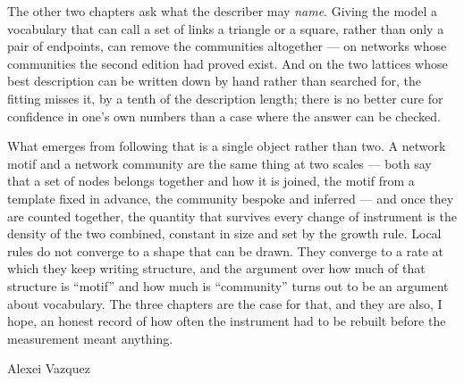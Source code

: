 \documentclass[10pt]{book}
\begin{document}
The other two chapters ask what the describer may \emph{name}. Giving the model a
vocabulary that can call a set of links a triangle or a square, rather than only
a pair of endpoints, can remove the communities altogether --- on networks whose
communities the second edition had proved exist. And on the two lattices whose
best description can be written down by hand rather than searched for, the
fitting misses it, by a tenth of the description length; there is no better cure
for confidence in one's own numbers than a case where the answer can be checked.

What emerges from following that is a single object rather than two. A network
motif and a network community are the same thing at two scales --- both say that
a set of nodes belongs together and how it is joined, the motif from a template
fixed in advance, the community bespoke and inferred --- and once they are
counted together, the quantity that survives every change of instrument is the
density of the two combined, constant in size and set by the growth rule. Local
rules do not converge to a shape that can be drawn. They converge to a rate at
which they keep writing structure, and the argument over how much of that
structure is ``motif'' and how much is ``community'' turns out to be an argument
about vocabulary. The three chapters are the case for that, and they are also, I
hope, an honest record of how often the instrument had to be rebuilt before the
measurement meant anything.

\vspace{1em}
\noindent Alexei Vazquez

\tableofcontents













\end{document}
